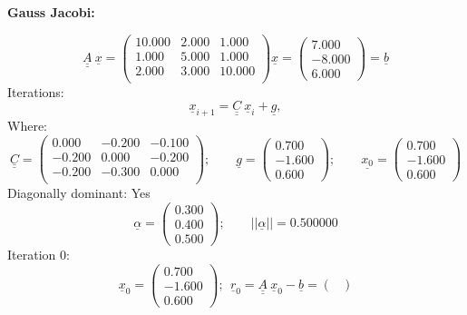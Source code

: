 \documentclass{report}[10pts]
\begin{document}
\begin{small}
\begin{center}\textbf{Gauss Jacobi:}\end{center}
\[
   \underline{\underline{A}}~\underline{x}=
      \begin{pmatrix}
         10.000 & 2.000 & 1.000\\
         1.000 & 5.000 & 1.000\\
         2.000 & 3.000 & 10.000\\
      \end{pmatrix}
      \underline{x}=
      \begin{pmatrix}
      7.000 \\ -8.000 \\ 6.000
      \end{pmatrix}
   =\underline{b}
\]
Iterations:
\[
   \underline{x}_{i+1}=\underline{\underline{C}}~\underline{x}_i+\underline{g},
\]
Where:
\[
      \underline{\underline{C}}=
      \begin{pmatrix}
         0.000 & -0.200 & -0.100\\
         -0.200 & 0.000 & -0.200\\
         -0.200 & -0.300 & 0.000\\
      \end{pmatrix}
      ;\qquad
      \underline{g}=
      \begin{pmatrix}
      0.700 \\ -1.600 \\ 0.600
      \end{pmatrix}
      ;\qquad
      \underline{x_0}=
      \begin{pmatrix}
      0.700 \\ -1.600 \\ 0.600
      \end{pmatrix}
\]
Diagonally dominant: Yes
\[
      \underline{\alpha}=
      \begin{pmatrix}
      0.300 \\ 0.400 \\ 0.500
      \end{pmatrix}
      ;\qquad
   ||\underline{\alpha}||=0.500000
\]
Iteration 0:
\[
\underline{x}_{0}=
   \begin{pmatrix}
   0.700 \\ -1.600 \\ 0.600
   \end{pmatrix}
;~~
\underline{r}_{0}=
\underline{\underline{A}}~\underline{x}_{0}-
\underline{b}=
   \begin{pmatrix}

\end{pmatrix}\]
\end{small}
\end{document}
